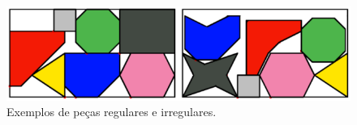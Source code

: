 \begin{figure}[H]
    \centering
    \caption{Exemplos de peças regulares e irregulares.}
    \label{fig:pieces-example}
    \includegraphics[scale=0.7]{utils/images/pieces-example}
\end{figure}
